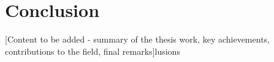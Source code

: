 \vspace{21.5pt}
\chapter{Conclusion}

[Content to be added - summary of the thesis work, key achievements, contributions to the field, final remarks]lusions
